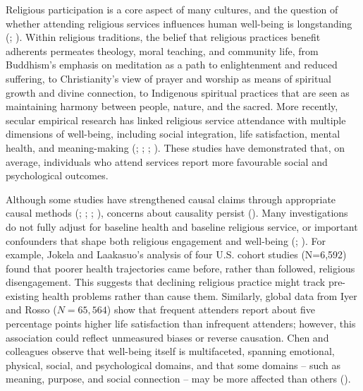 \documentclass[
  single column]{article}
\begin{document}
Religious participation is a core aspect of many cultures, and the
question of whether attending religious services influences human
well-being is longstanding (; ). Within religious traditions, the belief that religious
practices benefit adherents permeates theology, moral teaching, and
community life, from Buddhism's emphasis on meditation as a path to
enlightenment and reduced suffering, to Christianity's view of prayer
and worship as means of spiritual growth and divine connection, to
Indigenous spiritual practices that are seen as maintaining harmony
between people, nature, and the sacred. More recently, secular empirical
research has linked religious service attendance with multiple
dimensions of well-being, including social integration, life
satisfaction, mental health, and meaning-making
(;
;
;
). These studies have demonstrated that, on average, individuals
who attend services report more favourable social and psychological
outcomes.

Although some studies have strengthened causal claims through
appropriate causal methods (; ;
; ), concerns about causality persist
().
Many investigations do not fully adjust for baseline health and baseline
religious service, or important confounders that shape both religious
engagement and well-being (; ). For example, Jokela and Laakasuo's analysis of four
U.S. cohort studies (N=6,592) found that poorer health trajectories came
before, rather than followed, religious disengagement. This suggests
that declining religious practice might track pre-existing health
problems rather than cause them. Similarly, global data from Iyer and
Rosso (\(N=65,564\)) show that frequent attenders report about five
percentage points higher life satisfaction than infrequent attenders;
however, this association could reflect unmeasured biases or reverse
causation. Chen and colleagues observe that well-being itself is
multifaceted, spanning emotional, physical, social, and psychological
domains, and that some domains -- such as meaning, purpose, and social
connection -- may be more affected than others
().
\end{document}
